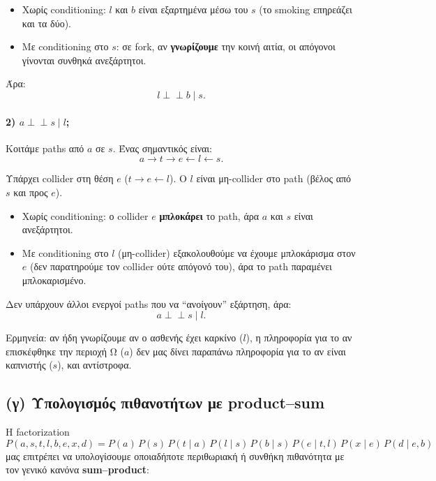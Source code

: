 \documentclass[a4paper,11pt]{article}
\begin{document}
\begin{itemize}
  \item Χωρίς conditioning: $l$ και $b$ είναι εξαρτημένα μέσω του $s$
        (το smoking επηρεάζει και τα δύο).
  \item Με conditioning στο $s$: σε fork, αν \textbf{γνωρίζουμε}
        την κοινή αιτία, οι απόγονοι γίνονται συνθηκά ανεξάρτητοι.
\end{itemize}

Άρα:
\[
\boxed{l \perp\!\!\!\perp b \mid s.}
\]

\paragraph{2) $a \perp\!\!\!\perp s \mid l$;}

Κοιτάμε paths από $a$ σε $s$.
Ένας σημαντικός είναι:
\[
a \to t \to e \leftarrow l \leftarrow s.
\]

Υπάρχει collider στη θέση $e$ ($t\to e \leftarrow l$).
Ο $l$ είναι μη-collider στο path (βέλος από $s$ και προς $e$).

\begin{itemize}
  \item Χωρίς conditioning: ο collider $e$ \textbf{μπλοκάρει} το path,
        άρα $a$ και $s$ είναι ανεξάρτητοι.
  \item Με conditioning στο $l$ (μη-collider) εξακολουθούμε να έχουμε
        μπλοκάρισμα στον $e$ (δεν παρατηρούμε τον collider ούτε απόγονό του),
        άρα το path παραμένει μπλοκαρισμένο.
\end{itemize}

Δεν υπάρχουν άλλοι ενεργοί paths που να ``ανοίγουν'' εξάρτηση,
άρα:
\[
\boxed{a \perp\!\!\!\perp s \mid l.}
\]

Ερμηνεία: αν ήδη γνωρίζουμε αν ο ασθενής έχει καρκίνο ($l$),
η πληροφορία για το αν επισκέφθηκε την περιοχή Ω ($a$) δεν μας δίνει
παραπάνω πληροφορία για το αν είναι καπνιστής ($s$), και αντίστροφα.

\subsection{(γ) Υπολογισμός πιθανοτήτων με product–sum}

Η factorization
\[
P(a,s,t,l,b,e,x,d)
= P(a)\,P(s)\,P(t \mid a)\,P(l \mid s)\,P(b \mid s)\,
  P(e \mid t,l)\,P(x \mid e)\,P(d \mid e,b)
\]
μας επιτρέπει να υπολογίσουμε οποιαδήποτε περιθωριακή ή συνθήκη
πιθανότητα με τον γενικό κανόνα \textbf{sum–product}:
\end{document}
